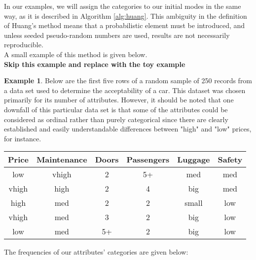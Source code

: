 \documentclass{article}
\theoremstyle{definition}
\newtheorem{example}{Example}
\begin{document}
In our examples, we will assign the categories to our initial modes in the same way, as it is described in Algorithm \ref{alg:huang}. This ambiguity in the definition of Huang's method means that a probabilistic element must be introduced, and unless seeded pseudo-random numbers are used, results are not necessarily reproducible. \\

A small example of this method is given below. \\

{\textbf{\large{Skip this example and replace with the toy example}}}

\begin{example}	
	Below are the first five rows of a random sample of 250 records from a data set used to determine the acceptability of a car. This dataset was chosen primarily for its number of attributes. However, it should be noted that one downfall of this particular data set is that some of the attributes could be considered as ordinal rather than purely categorical since there are clearly established and easily understandable differences between "high" and "low" prices, for instance. \\
	
	\begin{table}[H]
		\centering
			\begin{tabular}{c|c|c|c|c|c}\label{table:1}
			Price & Maintenance & Doors & Passengers & Luggage & Safety \\
			\hline
			low &               vhigh &            2 &                  5+ &              med &          med \\
        	vhigh &             high &            2 &                  4 &              big &          med \\
        	high &             med &            2 &                  2 &              small &          low \\          
        	vhigh &              med &            3 &                  2 &            big &          low \\         
        	low &             med &            5+ &                  2 &              big &           low \\
			\end{tabular}
	\end{table}
	
	The frequencies of our attributes' categories are given below: \\
	

\end{example}
\end{document}
